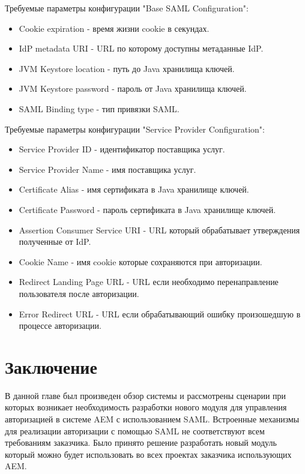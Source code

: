 Требуемые параметры конфигурации "Base SAML Configuration":
\begin{itemize}
\item Cookie expiration - время жизни cookie в секундах.
\item IdP metadata URI - URL по которому доступны метаданные IdP.
\item JVM Keystore location - путь до Java хранилища ключей.
\item JVM Keystore password - пароль от Java хранилища ключей.
\item SAML Binding type - тип привязки SAML.
\end{itemize}

Требуемые параметры конфигурации "Service Provider Configuration":
\begin{itemize}
\item Service Provider ID - идентификатор поставщика услуг.
\item Service Provider Name - имя поставщика услуг.
\item Certificate Alias - имя сертификата в Java хранилище ключей.
\item Certificate Password - пароль сертификата в Java хранилище ключей.
\item Assertion Consumer Service URI - URL который обрабатывает утверждения полученные от IdP.
\item Cookie Name - имя cookie которые сохраняются при авторизации.
\item Redirect Landing Page URL - URL если необходимо перенаправление пользователя после авторизации.
\item Error Redirect URL - URL если обрабатывающий ошибку произошедшую в процессе авторизации.
\end{itemize}

\section{Заключение}
В данной главе был произведен обзор системы и рассмотрены сценарии при которых возникает необходимость разработки нового модуля для управления авторизацией в системе AEM с использованием SAML. Встроенные механизмы для реализации авторизации с помощью SAML не соответствуют всем требованиям заказчика. Было принято решение разработать новый модуль который можно будет использовать во всех проектах заказчика использующих AEM.


